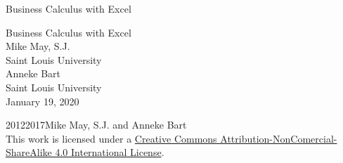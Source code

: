 \documentclass[oneside,10pt,]{book}
\numberwithin{equation}{section}
\begin{document}
\frontmatter
\thispagestyle{empty}
{\centering
\vspace*{0.28\textheight}
{\Huge Business Calculus with Excel}\\}
\clearpage
\thispagestyle{empty}
\null%
\clearpage
\thispagestyle{empty}
{\centering
\vspace*{0.14\textheight}
{\Huge Business Calculus with Excel}\\[3\baselineskip]
{\Large Mike May, S.J.}\\[0.5\baselineskip]
{\Large Saint Louis University}\\[3\baselineskip]
{\Large Anneke Bart}\\[0.5\baselineskip]
{\Large Saint Louis University}\\[3\baselineskip]
{\Large January 19, 2020}\\}
\clearpage
\thispagestyle{empty}
\hypertarget{g:colophon:idm291768310592}{}
\noindent\textcopyright{}2012\textendash{}2017\quad{}Mike May, S.J. and Anneke Bart\\[0.5\baselineskip]
 This work is licensed under a \href{http://creativecommons.org/licenses/by-nc-sa/4.0/}{Creative Commons Attribution-NonComercial-ShareAlike 4.0 International License}.\par\medskip
{}
\null\clearpage
%
%
\typeout{************************************************}
\typeout{************************************************}
%
\end{document}
